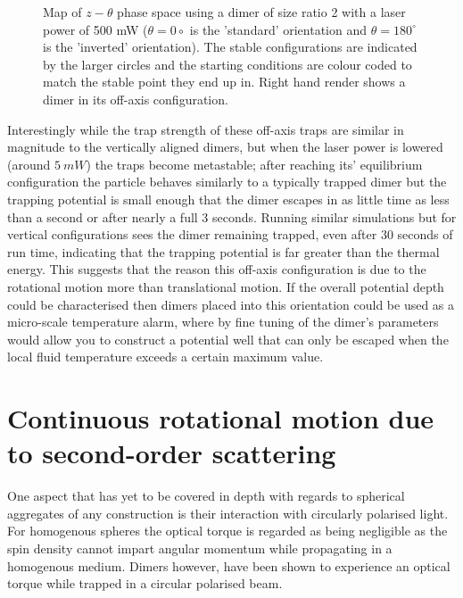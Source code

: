 \begin{figure}[h!]
\begin{subfigure}{0.32\linewidth}
		\caption{}
	\end{subfigure}
	\caption{Map of $z-\theta$ phase space using a dimer of size ratio 2 with 
		a laser power of 500 mW ($\theta=0\circ$ is the 'standard' orientation 
		and $\theta=180^\circ$ is the 'inverted' orientation). The stable 
		configurations are indicated by the larger circles and the starting 
		conditions are colour coded to match the stable point they end up in. 
		Right hand render shows a dimer in its off-axis configuration.}
	\label{fig:off_axis}
\end{figure}

Interestingly while the trap strength of these off-axis traps are similar 
in magnitude to the vertically aligned dimers, but when the laser power 
is lowered (around $5\ mW$) the traps become metastable; after reaching its'
equilibrium configuration the particle behaves similarly to a typically
trapped dimer but the trapping potential is small enough that the dimer
escapes in as little time as less than a second or after nearly a full 
3 seconds. Running similar simulations but for vertical configurations 
sees the dimer remaining trapped, even after 30 seconds of run time, 
indicating that the trapping potential is far greater than the thermal 
energy. This suggests that the reason this off-axis configuration is due 
to the rotational motion more than translational motion. If the overall 
potential depth could be characterised then dimers placed into this 
orientation could be used as a micro-scale temperature alarm, where 
by fine tuning of the dimer's parameters would allow you to construct a 
potential well that can only be escaped when the local fluid temperature 
exceeds a certain maximum value.  

\section{Continuous rotational motion due to second-order scattering}

One aspect that has yet to be covered in depth with regards to spherical 
aggregates of any construction is their interaction with circularly 
polarised light. For homogenous spheres the optical torque is regarded as
being negligible as the spin density cannot impart angular momentum while 
propagating in a homogenous medium. Dimers however, have been shown to
experience an optical torque \cite{Vigilante2020, Ahn2018, Reimann2018} 
while trapped in a circular polarised beam. 

